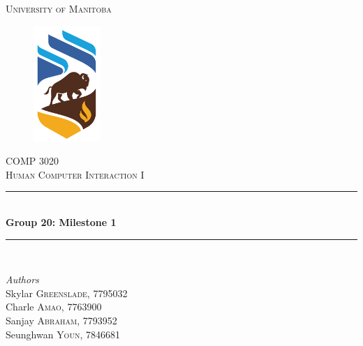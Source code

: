 \documentclass{article}
\begin{document}
\begin{titlepage} %
	\newcommand{\HRule}{\rule{\linewidth}{0.5mm}} %
	
	\center %
	
	
	\textsc{\LARGE University of Manitoba}\\[1.5cm] %
	
	\begin{figure}
	    \centering
	    \includegraphics[width=1in]{uofmlogo.png}
	    \label{fig:uofm}
	\end{figure}
	
	\textsc{\Large COMP 3020}\\[0.5cm] %
	
	\textsc{\large Human Computer Interaction I}\\[0.5cm] %
	
	
	\HRule\\[0.4cm]
	
	{\huge\bfseries Group 20: Milestone 1}\\[0.4cm] %
	
	\HRule\\[1.5cm]
	
	
	\begin{minipage}{0.4\textwidth}
		\begin{flushleft}
			\large
			\textit{Authors}\\
			Skylar \textsc{Greenslade}, 7795032\\
			Charle \textsc{Amao}, 7763900\\%
			Sanjay \textsc{Abraham}, 7793952\\
			Seunghwan \textsc{Youn}, 7846681
			

\end{flushleft}
\end{minipage}
\end{titlepage}
\end{document}

